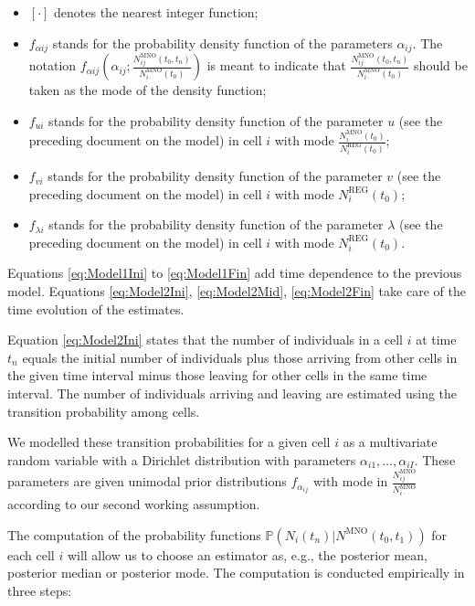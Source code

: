 \documentclass[12pt, a4paper]{article}
\begin{document}
\begin{itemize}
	\item $[\cdot]$ denotes the nearest integer function;
	\item $f_{\alpha ij}$ stands for the probability density function of the parameters $\alpha_{ij}$. The notation $f_{\alpha ij}\left(\alpha_{ij}; \frac{N_{ij}^{\textrm{MNO}}(t_{0}, t_{n})}{N_{i\cdot}^{\textrm{MNO}}(t_{0})}\right)$ is meant to indicate that $\frac{N_{ij}^{\textrm{MNO}}(t_{0}, t_{n})}{N_{i\cdot}^{\textrm{MNO}}(t_{0})}$ should be taken as the mode of the density function;
	\item $f_{ui}$ stands for the probability density function of the parameter $u$ (see the preceding document on the model) in cell $i$ with mode $\frac{N_{i}^{\textrm{MNO}}(t_{0})}{N_{i}^{\textrm{REG}}(t_{0})}$;
	\item $f_{vi}$ stands for the probability density function of the parameter $v$ (see the preceding document on the model) in cell $i$ with mode $N_{i}^{\textrm{REG}}(t_{0})$;
	\item $f_{\lambda i}$ stands for the probability density function of the parameter $\lambda$ (see the preceding document on the model) in cell $i$ with mode $N_{i}^{\textrm{REG}}(t_{0})$. 
\end{itemize}


Equations \eqref{eq:Model1Ini} to \eqref{eq:Model1Fin} add time dependence to the previous model.  Equations \eqref{eq:Model2Ini}, \eqref{eq:Model2Mid}, \eqref{eq:Model2Fin} take care of the time evolution of the estimates.

Equation \eqref{eq:Model2Ini} states that the number of individuals in a cell $i$ at time $t_{n}$ equals the initial number of individuals plus those arriving from other cells in the given time interval minus those leaving for other cells in the same time interval. The number of individuals arriving and leaving are estimated using the transition probability among cells.

We modelled these transition probabilities for a given cell $i$ as a multivariate random variable with a Dirichlet distribution with parameters $\alpha_{i1},\dots,\alpha_{iI}$. These parameters  are given unimodal prior distributions $f_{\alpha_{ij}}$ with mode in $\frac{N_{ij}^{\textrm{MNO}}}{N_{i\cdot}^{\textrm{MNO}}}$ according to our second working assumption.

The computation of the probability functions $\mathbb{P}\left(N_{i}(t_{n})\big|N^{\textrm{MNO}}(t_{0}, t_{1})\right)$ for each cell $i$ will allow us to choose an estimator as, e.g., the posterior mean, posterior median or posterior mode. The computation is conducted empirically in three steps:
\end{document}
